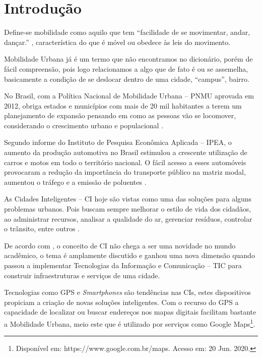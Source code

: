 %
%

\chapter{Introdução}\label{chap:introducao}  

Define-se mobilidade como aquilo que tem “facilidade de se movimentar, andar, dançar.” \cite{mobilidade}, característica do que é móvel ou obedece às leis do movimento. 

Mobilidade Urbana já é um termo que não encontramos no dicionário, porém de fácil compreensão,
pois logo relacionamos a algo que de fato é ou se assemelha, basicamente a condição
de se deslocar dentro de uma cidade, “campus”, bairro. %



No Brasil, com a Política Nacional de Mobilidade Urbana -- PNMU aprovada em 2012, obriga estados e municípios com mais de 20 mil habitantes a terem um planejamento de expansão pensando em como as pessoas vão se locomover, considerando o crescimento urbano e populacional  \cite{lei12587}.

Segundo informe do Instituto de Pesquisa Econômica Aplicada -- IPEA, o aumento da produção automotiva no Brasil estimulou a crescente utilização de carros e motos em todo o território nacional. O fácil acesso a esses automóveis provocaram a redução da importância do transporte público na matriz modal, aumentou o tráfego e a emissão de poluentes \cite{ipea}.
 
As Cidades Inteligentes -- CI hoje são vistas como uma das soluções para alguns problemas urbanos. Pois buscam sempre melhorar o estilo de vida dos cidadãos, ao administrar recursos, analisar a qualidade do ar, gerenciar resíduos, controlar o trânsito, entre outros \cite{chourabi}.

De acordo com , o conceito de CI não chega a ser uma novidade no mundo acadêmico, o tema é amplamente discutido e ganhou uma nova dimensão quando passou a implementar Tecnologias da Informação e Comunicação -- TIC para construir infraestruturas e serviços de uma cidade.	

Tecnologias como GPS e \textit{Smartphones} são tendências nas CIs, estes dispositivos propiciam a criação de novas soluções inteligentes. Com o recurso do GPS a capacidade de localizar ou buscar endereços nos mapas digitais facilitam bastante a Mobilidade Urbana, meio este que é utilizado por serviços como Google Maps\footnote{Disponível em: https://www.google.com.br/maps. Acesso em: 20 Jun. 2020.}.

